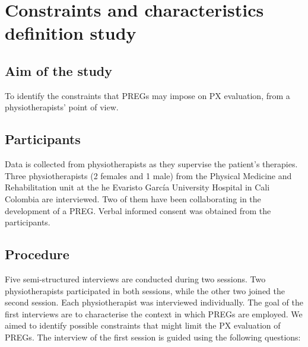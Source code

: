 \begin{table}[h]
\caption{Capabilities of each degree of autonomy of \acp{PREG}}
\label{tab:autonomy_dgree}
\myfloatalign
{}
\end{table}

\section{Constraints and characteristics definition study}\label{sec:study_char} %

\subsection{Aim of the study}
To identify the constraints that \acp{PREG} may impose on \ac{PX} evaluation, from a physiotherapists' point of view.

\subsection{Participants}
Data is collected from physiotherapists as they supervise the patient's therapies. Three physiotherapists (2 females and 1 male) from the Physical Medicine and Rehabilitation unit at the he Evaristo Garc\'ia University Hospital in Cali Colombia are interviewed. Two of them have been collaborating in the development of a \ac{PREG}. Verbal informed consent was obtained from the participants.

\subsection{Procedure}
Five semi-structured interviews are conducted during two sessions. Two physiotherapists participated in both sessions, while the other two joined the second session. Each physiotherapist was interviewed individually. The goal of the first interviews are to characterise the context in which \acp{PREG} are employed. We aimed to identify possible constraints that might limit the \ac{PX} evaluation of \acp{PREG}. The interview of the first session is guided using the following questions:


